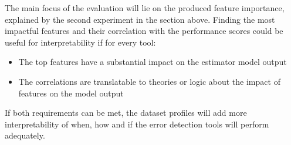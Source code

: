 The main focus of the evaluation will lie on the produced feature importance, explained by the second experiment in the section above. Finding the most impactful features and their correlation with the performance scores could be useful for interpretability if for every tool:
\begin{itemize}
    \item The top features have a substantial impact on the estimator model output
    \item The correlations are translatable to theories or logic about the impact of features on the model output
\end{itemize}

If both requirements can be met, the dataset profiles will add more interpretability of when, how and if the error detection tools will perform adequately.